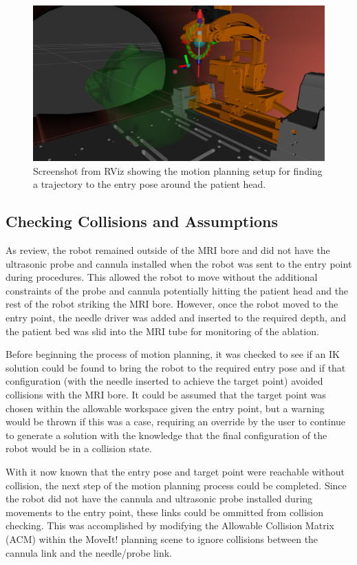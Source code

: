\documentclass[12pt]{report}
\begin{document}
\begin{figure}[thpb]
	\centering
	\includegraphics[width=\textwidth]{images/motion_planning_setup_2.png}
    \caption{Screenshot from RViz showing the motion planning setup for finding a trajectory to the entry pose around the patient head.}
    \label{fig:motionPlanningSetup}
\end{figure}

\subsection{Checking Collisions and Assumptions}
As review, the robot remained outside of the MRI bore and did not have the ultrasonic probe and cannula installed when the robot was sent to the entry point during procedures. This allowed the robot to move without the additional constraints of the probe and cannula potentially hitting the patient head and the rest of the robot striking the MRI bore. However, once the robot moved to the entry point, the needle driver was added and inserted to the required depth, and the patient bed was slid into the MRI tube for monitoring of the ablation. 

Before beginning the process of motion planning, it was checked to see if an IK solution could be found to bring the robot to the required entry pose and if that configuration (with the needle inserted to achieve the target point) avoided collisions with the MRI bore. It could be assumed that the target point was chosen within the allowable workspace given the entry point, but a warning would be thrown if this was a case, requiring an override by the user to continue to generate a solution with the knowledge that the final configuration of the robot would be in a collision state.

With it now known that the entry pose and target point were reachable without collision, the next step of the motion planning process could be completed. Since the robot did not have the cannula and ultrasonic probe installed during movements to the entry point, these links could be ommitted from collision checking. This was accomplished by modifying the Allowable Collision Matrix (ACM) within the MoveIt! planning scene to ignore collisions between the cannula link and the needle/probe link. 
\end{document}
